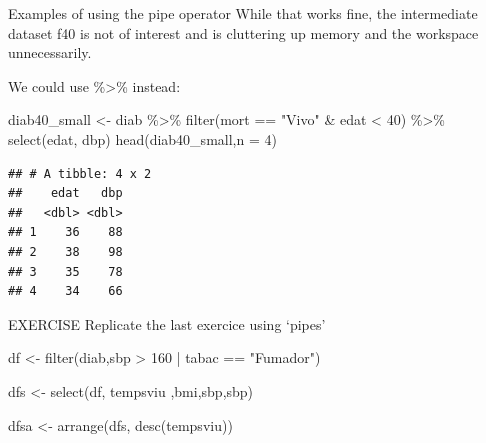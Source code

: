 \documentclass[
  ignorenonframetext,
]{beamer}
\newenvironment{Shaded}{\begin{snugshade}}{\end{snugshade}}
\newcommand{\AttributeTok}[1]{\textcolor[rgb]{0.77,0.63,0.00}{#1}}
\newcommand{\DecValTok}[1]{\textcolor[rgb]{0.00,0.00,0.81}{#1}}
\newcommand{\FunctionTok}[1]{\textcolor[rgb]{0.00,0.00,0.00}{#1}}
\newcommand{\NormalTok}[1]{#1}
\newcommand{\OtherTok}[1]{\textcolor[rgb]{0.56,0.35,0.01}{#1}}
\newcommand{\SpecialCharTok}[1]{\textcolor[rgb]{0.00,0.00,0.00}{#1}}
\newcommand{\StringTok}[1]{\textcolor[rgb]{0.31,0.60,0.02}{#1}}
\begin{document}
\begin{frame}[fragile]{Examples of using the pipe operator}
\protect\hypertarget{examples-of-using-the-pipe-operator-1}{}
While that works fine, the intermediate dataset f40 is not of interest
and is cluttering up memory and the workspace unnecessarily.

We could use \%\textgreater\% instead:

\footnotesize

\begin{Shaded}
\begin{Highlighting}[]
\NormalTok{diab40\_small }\OtherTok{\textless{}{-}}\NormalTok{ diab }\SpecialCharTok{\%\textgreater{}\%}   
  \FunctionTok{filter}\NormalTok{(mort }\SpecialCharTok{==} \StringTok{"Vivo"} \SpecialCharTok{\&}\NormalTok{ edat }\SpecialCharTok{\textless{}} \DecValTok{40}\NormalTok{) }\SpecialCharTok{\%\textgreater{}\%} 
  \FunctionTok{select}\NormalTok{(edat, dbp)}
\FunctionTok{head}\NormalTok{(diab40\_small,}\AttributeTok{n =} \DecValTok{4}\NormalTok{)}
\end{Highlighting}
\end{Shaded}

\begin{verbatim}
## # A tibble: 4 x 2
##    edat   dbp
##   <dbl> <dbl>
## 1    36    88
## 2    38    98
## 3    35    78
## 4    34    66
\end{verbatim}

\normalsize
\end{frame}

\begin{frame}[fragile]{EXERCISE}
\protect\hypertarget{exercise-1}{}
Replicate the last exercice using `pipes'

\footnotesize

\begin{Shaded}
\begin{Highlighting}[]
\NormalTok{df }\OtherTok{\textless{}{-}} \FunctionTok{filter}\NormalTok{(diab,sbp }\SpecialCharTok{\textgreater{}} \DecValTok{160} \SpecialCharTok{|}\NormalTok{ tabac }\SpecialCharTok{==} \StringTok{"Fumador"}\NormalTok{)}

\NormalTok{dfs }\OtherTok{\textless{}{-}} \FunctionTok{select}\NormalTok{(df, tempsviu ,bmi,sbp,sbp)}

\NormalTok{dfsa }\OtherTok{\textless{}{-}} \FunctionTok{arrange}\NormalTok{(dfs, }\FunctionTok{desc}\NormalTok{(tempsviu))}
\end{Highlighting}
\end{Shaded}

\normalsize

\footnotesize

\normalsize
\end{frame}
\end{document}
